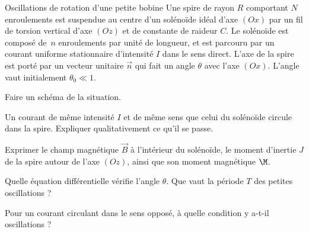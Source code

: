 	\begin{exo}[PC][3][colle]{Oscillations de rotation d'une petite bobine}
	Une spire de rayon $R$ comportant $N$ enroulements est suspendue au centre d'un solénoïde idéal d'axe $(Ox)$ par un fil de torsion vertical d'axe $(Oz)$ et de constante de raideur $C$. Le solénoïde est composé de~$n$ enroulements par unité de longueur, et est parcouru par un courant uniforme stationnaire d'intensité $I$ dans le sens direct. L'axe de la spire est porté par un vecteur unitaire $\Vec{n}$ qui fait un angle $\theta$ avec l'axe $(Ox)$.  L'angle vaut initialement $\theta_0 \ll 1$.
	\begin{quest}
	\item Faire un schéma de la situation.
	\item Un courant de même intensité $I$ et de même sens que celui du solénoïde circule dans la spire. Expliquer qualitativement ce qu'il se passe.
	\item Exprimer le champ magnétique $\Vec{B}$ à l'intérieur du solénoïde, le moment d'inertie $J$ de la spire autour de l'axe $(Oz)$, ainsi que son moment magnétique $\M$.
	\item Quelle équation différentielle vérifie l'angle $\theta$. Que vaut la période $T$ des petites oscillations ?
	\item Pour un courant circulant dans le sens opposé, à quelle condition y a-t-il oscillations  ?
	\end{quest}
	\end{exo}
	
